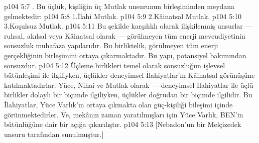 \vs p104 5:7 . Bu üçlük, kişiliğin üç Mutlak unsurunun birleşiminden meydana gelmektedir:
\vs p104 5:8 1.\bibnobreakspace İlahi Mutlak.
\vs p104 5:9 2.\bibnobreakspace Kâinatsal Mutlak.
\vs p104 5:10 3.\bibnobreakspace Koşulsuz Mutlak.
\vs p104 5:11 Bu şekilde karşılıklı olarak ilişkilenmiş unsurlar --- ruhsal, akılsal veya Kâinatsal olarak --- görülmeyen tüm enerji mevcudiyetinin sonsuzluk muhafaza yapılarıdır. Bu birliktelik, görülmeyen tüm enerji gerçekliğinin birleşimini ortaya çıkarmaktadır. Bu yapı, potansiyel bakımından sonsuzdur.
\vs p104 5:12 Üçleme birlikleri temel olarak sonsuzluğun işlevsel bütünleşimi ile ilgiliyken, üçlükler deneyimsel İlahiyatlar’ın Kâinatsal görünüşüne katılmaktadırlar. Yüce, Nihai ve Mutlak olarak --- deneyimsel İlahiyatlar ile üçlü birlikler dolaylı bir biçimde ilgiliyken, üçlükler doğrudan bir biçimde ilgilidir. Bu İlahiyatlar, Yüce Varlık’ın ortaya çıkmakta olan güç\hyp{}kişiliği bileşimi içinde görünmektedirler. Ve, mekânın zaman yaratılmışları için Yüce Varlık, BEN’in bütünlüğüne dair bir açığa çıkarılıştır.
\vs p104 5:13 [Nebadon’un bir Melçizedek unsuru tarafından sunulmuştur.]
